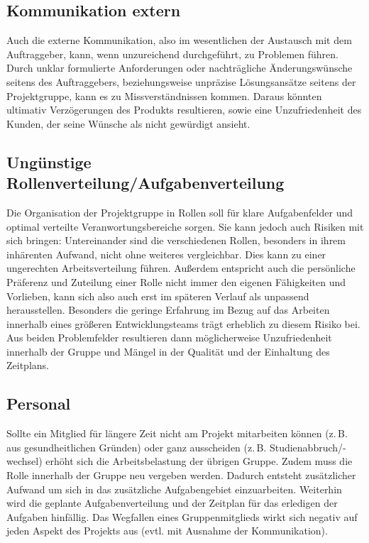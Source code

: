 \subsection{Kommunikation extern}\label{r3}
  Auch die externe Kommunikation, also im wesentlichen der Austausch mit dem Auftraggeber, kann, wenn unzureichend durchgeführt, zu Problemen führen. Durch unklar formulierte Anforderungen oder nachträgliche Änderungswünsche seitens des Auftraggebers, beziehungsweise unpräzise Lösungsansätze seitens der Projektgruppe, kann es zu Missverständnissen kommen. Daraus könnten ultimativ Verzögerungen des Produkts resultieren, sowie eine Unzufriedenheit des Kunden, der seine Wünsche als nicht gewürdigt ansieht.

\Hack{\enlargethispage{1.0\baselineskip}}
\subsection{Ungünstige Rollenverteilung/Aufgabenverteilung}\label{r5}
  Die Organisation der Projektgruppe in Rollen soll für klare Aufgabenfelder und optimal verteilte Veranwortungsbereiche sorgen. Sie kann jedoch auch Risiken mit sich bringen: Untereinander sind die verschiedenen Rollen, besonders in ihrem inhärenten Aufwand, nicht ohne weiteres vergleichbar. Dies kann zu einer ungerechten Arbeitsverteilung führen. Außerdem entspricht auch die persönliche Präferenz und Zuteilung einer Rolle nicht immer den eigenen Fähigkeiten und Vorlieben, kann sich also auch erst im späteren Verlauf als unpassend herausstellen. Besonders die geringe Erfahrung im Bezug auf das Arbeiten innerhalb eines größeren Entwicklungsteams trägt erheblich zu diesem Risiko bei. Aus beiden Problemfelder resultieren dann möglicherweise Unzufriedenheit innerhalb der Gruppe und Mängel in der Qualität und der Einhaltung des Zeitplans.

\subsection{Personal}\label{r4}
  Sollte ein Mitglied für längere Zeit nicht am Projekt mitarbeiten können (z.\,B. aus gesundheitlichen Gründen) oder ganz ausscheiden (z.\,B. Studienabbruch/-wechsel) erhöht sich die Arbeitsbelastung der übrigen Gruppe.
  Zudem muss die Rolle innerhalb der Gruppe neu vergeben werden.
  Dadurch entsteht zusätzlicher Aufwand um sich in das zusätzliche Aufgabengebiet einzuarbeiten.
  Weiterhin wird die geplante Aufgabenverteilung und der Zeitplan für das erledigen der Aufgaben hinfällig.
  Das Wegfallen eines Gruppenmitglieds wirkt sich negativ auf jeden Aspekt des Projekts aus (evtl. mit Ausnahme der Kommunikation).
  


